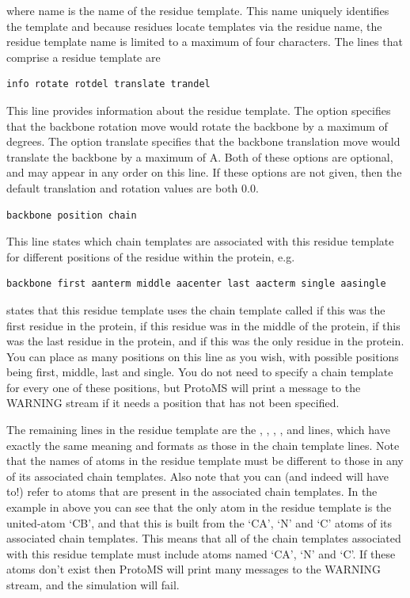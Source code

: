 \documentclass[letterpaper,10pt,english]{manual}
\begin{document}
where name is the name of the residue template. This name uniquely identifies the template and because residues locate templates via the residue name, the residue template name is limited to a maximum of four characters. The lines that comprise a residue template are

\begin{Verbatim}[commandchars=@\[\]]
info rotate rotdel translate trandel
\end{Verbatim}

This line provides information about the residue template. The option   specifies that the backbone rotation move would rotate the backbone by a maximum of  degrees. The option translate  specifies that the backbone translation move would translate the backbone by a maximum of  A. Both of these options are optional, and may appear in any order on this line. If these options are not given, then the default translation and rotation values are both 0.0.

\begin{Verbatim}[commandchars=@\[\]]
backbone position chain
\end{Verbatim}

This line states which chain templates are associated with this residue template for different positions of the residue within the protein, e.g.

\begin{Verbatim}[commandchars=@\[\]]
backbone first aanterm middle aacenter last aacterm single aasingle
\end{Verbatim}

states that this residue template uses the chain template called  if this was the first residue in the protein,  if this residue was in the middle of the protein,  if this was the last residue in the protein, and  if this was the only residue in the protein. You can place as many positions on this line as you wish, with possible positions being first, middle, last and single. You do not need to specify a chain template for every one of these positions, but ProtoMS will print a message to the WARNING stream if it needs a position that has not been specified.

The remaining lines in the residue template are the , , , ,  and  lines, which have exactly the same meaning and formats as those in the chain template lines. Note that the names of atoms in the residue template must be different to those in any of its associated chain templates. Also note that you can (and indeed will have to!) refer to atoms that are present in the associated chain templates. In the example in above you can see that the only atom in the residue template is the united-atom ‘CB’, and that this is built from the ‘CA’, ‘N’ and ‘C’ atoms of its associated chain templates. This means that all of the chain templates associated with this residue template must include atoms named ‘CA’, ‘N’ and ‘C’. If these atoms don’t exist then ProtoMS will print many messages to the WARNING stream, and the simulation will fail.
\end{document}
